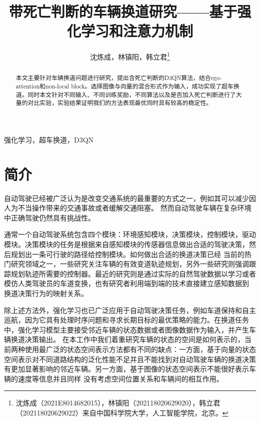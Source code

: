 \documentclass[letterpaper, 10 pt, conference]{ieeeconf}  %
\title{\LARGE \bf
带死亡判断的车辆换道研究——基于强化学习和注意力机制
}
\author{沈炼成，林镇阳，韩立君\thanks{沈炼成（2021E8014682015），林镇阳（202118020629020），韩立君（202118020629022）来自中国科学院大学，人工智能学院，北京。    } }%
\begin{document}
\maketitle
\thispagestyle{empty}
\pagestyle{empty}


\begin{abstract}
本文主要针对车辆换道问题进行研究，提出含死亡判断的D3QN算法，结合ego-attention和non-local block。选择图像与向量的混合形式作为输入，成功实现了超车换道。同时本文针对不同输入、不同训练奖励，不同算法以及是否加入死亡判断进行了大量的对比实验，实验结果证明我们的方法表现最优同时具有较高的稳定性。

\end{abstract}

\begin{keywords}
    强化学习，超车换道，D3QN
\end{keywords}


\section{简介}

自动驾驶已经被广泛认为是改变交通系统的最重要的方式之一，例如其可以减少因人为不当操作带来的交通事故或者缓解交通阻塞\cite{FAGNANT2015167}。
然而自动驾驶车辆在复杂环境中正确驾驶仍然具有挑战性。

通常一个自动驾驶系统包含四个模块：环境感知模块，决策模块，控制模块，驱动模块\cite{li2018reinforcement}。决策模块的任务是根据来自感知模块的传感器信息做出合适的驾驶决策，然后规划出一条可行驶的路径给控制模块。如何做出合适的换道决策已经
当前的热门研究领域之一，一些研究关注车辆的有效变道轨迹规划\cite{xu2012dynamic,yang2018dynamic}，另外一些研究则强调跟踪规划轨迹所需要的控制器\cite{cesari2017scenario,suh2018stochastic}。最近的研究则是通过实际的自然驾驶数据以学习或者模仿人类驾驶员的车道变换\cite{wang2014investigation,li2017retrieving,xu2018naturalistic}，也有研究者利用端到端的技术直接建立感知数据到
换道决策行为的映射关系\cite{jeong2017end}。

除上述方法外，强化学习也已广泛应用于自动驾驶决策任务，例如车道保持\cite{oh2000new,sallab2016end}和自主巡航\cite{desjardins2011cooperative}，因为它具有处理时序问题和寻求长期目标的最优策略的能力。在换道任务中，强化学习模型主要接受邻近车辆的状态数据或者图像数据作为输入\cite{li2019reinforcement,wang2019lane}，并产生车辆换道决策输出。
在本工作中我们着重研究车辆的状态的空间是如何表示的，当前两种使用最广泛的状态空间表示方法都有不同的缺点：一方面，基于向量的状态空间表示对不同道路结构的泛化性能不足并且不能找到对自动驾驶车辆的换道决策有更加显著影响的邻近车辆。另一方面，基于图像的状态空间表示不能很好表示车辆的速度等信息并且同样
没有考虑空间位置关系和车辆间的相互作用。
\end{document}
